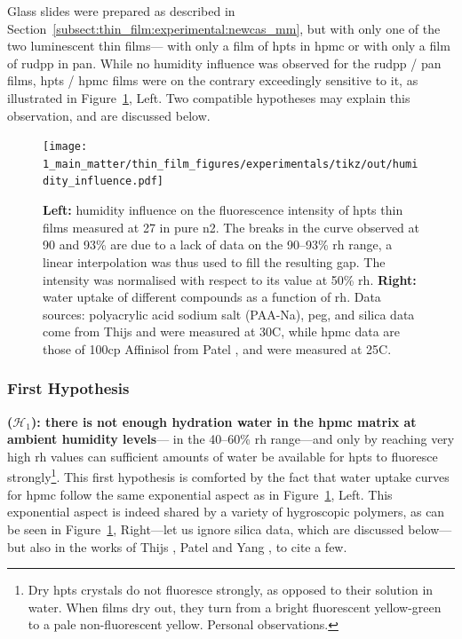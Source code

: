 Glass slides were prepared as described in Section~\ref{subsect:thin_film:experimental:newcas_mm}, but with only one of the two luminescent thin films---\ie{} with only a film of \gls{hpts} in \gls{hpmc} or with only a film of \gls{rudpp} in \gls{pan}. While no humidity influence was observed for the \gls{rudpp} / \gls{pan} films, \gls{hpts} / \gls{hpmc} films were on the contrary exceedingly sensitive to it, as illustrated in Figure~\ref{fig:thin_film:experimental:humidity_influence}, Left. Two compatible hypotheses may explain this observation, and are discussed below.

\begin{figure}
	\centering
	\texttt{[image: 1\_main\_matter/thin\_film\_figures/experimentals/tikz/out/humidity\_influence.pdf]}
	\caption[Humidity influence on \gls{hpts} thin films fluorescence, and comparison with the water uptake of other polymers.]{\textbf{Left:} humidity influence on the fluorescence intensity of \gls{hpts} thin films measured at 27{\degree} in pure \gls{n2}. The breaks in the curve observed at 90 and 93\% are due to a lack of data on the 90--93\% \gls{rh} range, a linear interpolation was thus used to fill the resulting gap. The intensity was normalised with respect to its value at 50\% \gls{rh}. \textbf{Right:} water uptake of different compounds as a function of \gls{rh}. Data sources: polyacrylic acid sodium salt (PAA-Na), \gls{peg}, and silica data come from Thijs \etal{}\cite{thijs2007} and were measured at 30{\degree}C, while \gls{hpmc} data are those of 100cp Affinisol from Patel \etal{}\cite{patel2022_part2}, and were measured at 25{\degree}C.}
	\label{fig:thin_film:experimental:humidity_influence}
\end{figure}

\subsubsection{First Hypothesis}

\textbf{($\mathcal{H}_1$): there is not enough hydration water in the \gls{hpmc} matrix at ambient humidity levels}---\ie{} in the 40--60\% \gls{rh} range---and only by reaching very high \gls{rh} values can sufficient amounts of water be available for \gls{hpts} to fluoresce strongly\footnote{Dry \gls{hpts} crystals do not fluoresce strongly, as opposed to their solution in water. When films dry out, they turn from a bright fluorescent yellow-green to a pale non-fluorescent yellow. Personal observations.}. This first hypothesis is comforted by the fact that water uptake curves for \gls{hpmc} follow the same exponential aspect as in Figure~\ref{fig:thin_film:experimental:humidity_influence}, Left. This exponential aspect is indeed shared by a variety of hygroscopic polymers, as can be seen in Figure~\ref{fig:thin_film:experimental:humidity_influence}, Right---let us ignore silica data, which are discussed below---but also in the works of Thijs \etal{}\cite{thijs2007}, Patel \etal{}\cite{patel2022_part1, patel2022_part2, patel2023_part3} and Yang \etal{}\cite{yang2020capsule}, to cite a few.

